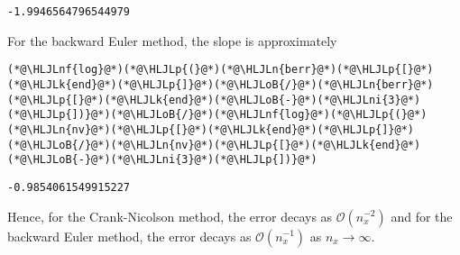 \documentclass[12pt,a4paper]{article}
\newcommand{\HLJLk}[1]{\textcolor[RGB]{148,91,176}{\textbf{#1}}}
\newcommand{\HLJLn}[1]{#1}
\newcommand{\HLJLnf}[1]{\textcolor[RGB]{66,102,213}{#1}}
\newcommand{\HLJLni}[1]{\textcolor[RGB]{59,151,46}{#1}}
\newcommand{\HLJLoB}[1]{\textcolor[RGB]{102,102,102}{\textbf{#1}}}
\newcommand{\HLJLp}[1]{#1}
\begin{document}
\begin{lstlisting}
-1.9946564796544979
\end{lstlisting}


For the backward Euler method, the slope is approximately


\begin{lstlisting}
(*@\HLJLnf{log}@*)(*@\HLJLp{(}@*)(*@\HLJLn{berr}@*)(*@\HLJLp{[}@*)(*@\HLJLk{end}@*)(*@\HLJLp{]}@*)(*@\HLJLoB{/}@*)(*@\HLJLn{berr}@*)(*@\HLJLp{[}@*)(*@\HLJLk{end}@*)(*@\HLJLoB{-}@*)(*@\HLJLni{3}@*)(*@\HLJLp{])}@*)(*@\HLJLoB{/}@*)(*@\HLJLnf{log}@*)(*@\HLJLp{(}@*)(*@\HLJLn{nv}@*)(*@\HLJLp{[}@*)(*@\HLJLk{end}@*)(*@\HLJLp{]}@*)(*@\HLJLoB{/}@*)(*@\HLJLn{nv}@*)(*@\HLJLp{[}@*)(*@\HLJLk{end}@*)(*@\HLJLoB{-}@*)(*@\HLJLni{3}@*)(*@\HLJLp{])}@*)
\end{lstlisting}

\begin{lstlisting}
-0.9854061549915227
\end{lstlisting}


Hence, for the Crank-Nicolson method, the error decays as $\mathcal{O}(n_x^{-2})$ and for the backward Euler method, the error decays as $\mathcal{O}(n_x^{-1})$ as $n_x \to \infty$.
\end{document}
